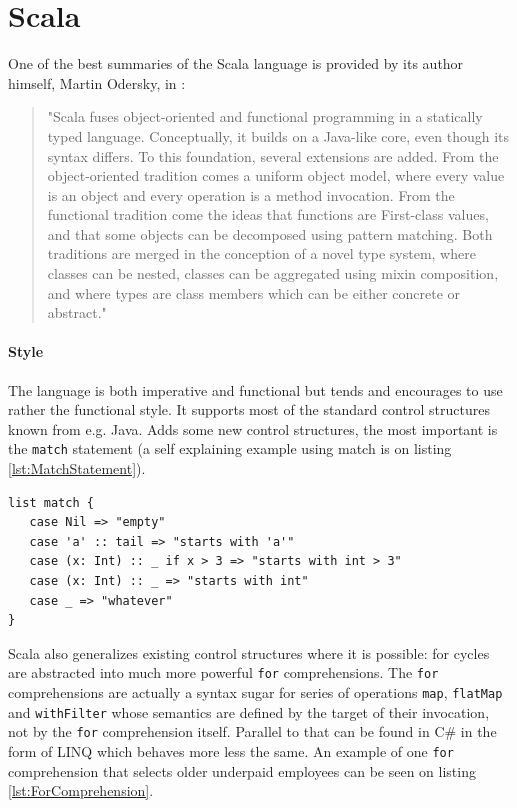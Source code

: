 \documentclass[12pt,a4paper]{report}
\begin{document}
\section{Scala}

One of the best summaries of the Scala language is provided by its author himself, Martin Odersky, in  \cite{ScalableComponents}:

\begin{quote}
"Scala fuses object-oriented and functional programming in a statically typed language. Conceptually, it builds on a Java-like core, even though its syntax differs. To this foundation, several extensions are added. From the object-oriented tradition comes a uniform object model, where every value is an object and every operation is a method invocation. From the functional tradition come the ideas that functions are First-class values, and that some objects can be decomposed using pattern matching. Both traditions are merged in the conception of a novel type system, where classes can be nested, classes can be aggregated using mixin composition, and where types are class members which can be either concrete or abstract."
\end{quote}

\paragraph{Style} The language is both imperative and functional but tends and encourages to use rather the functional style. It supports most of the standard control structures known from e.g. Java. Adds some new control structures, the most important is the \texttt{match} statement (a self explaining example using match is on listing \ref{lst:MatchStatement}).

\begin{minipage}{\linewidth}
\begin{lstlisting}[caption={Match statement example.},label={lst:MatchStatement}]
list match {
   case Nil => "empty"
   case 'a' :: tail => "starts with 'a'"
   case (x: Int) :: _ if x > 3 => "starts with int > 3"
   case (x: Int) :: _ => "starts with int"
   case _ => "whatever"
}
\end{lstlisting}
\end{minipage}

Scala also generalizes existing control structures where it is possible: for cycles are abstracted into much more powerful \texttt{for} comprehensions. The \texttt{for} comprehensions are actually a syntax sugar for series of operations \texttt{map}, \texttt{flatMap} and \texttt{withFilter} whose semantics are defined by the target of their invocation, not by the \texttt{for} comprehension itself. Parallel to that can be found in C\# in the form of LINQ \cite{Linq} which behaves more less the same. An example of one \texttt{for} comprehension that selects older underpaid employees can be seen on listing \ref{lst:ForComprehension}.
\end{document}
